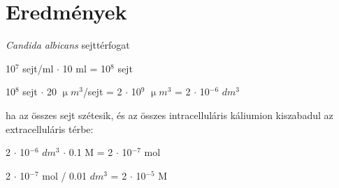 \chapter{Eredmények}
\pagestyle{headings}

\emph{Candida albicans} sejttérfogat \cite{chaffin1984relationship}

10$^7$ sejt/ml $\cdot$ 10 ml = 10$^8$ sejt

10$^8$ sejt $\cdot$ 20 $\upmu m^3$/sejt = 2 $\cdot$ 10$^9$ $\upmu m^3$ = 2 $\cdot$ 10$^{-6}$ $dm^3$

ha az összes sejt szétesik, és az összes intracelluláris káliumion kiszabadul az extracelluláris térbe:

2 $\cdot$ 10$^{-6}$ $dm^3$ $\cdot$ 0.1 M = 2 $\cdot$ 10$^{-7}$ mol

2 $\cdot$ 10$^{-7}$ mol / 0.01 $dm^3$ = 2 $\cdot$ 10$^{-5}$ M


